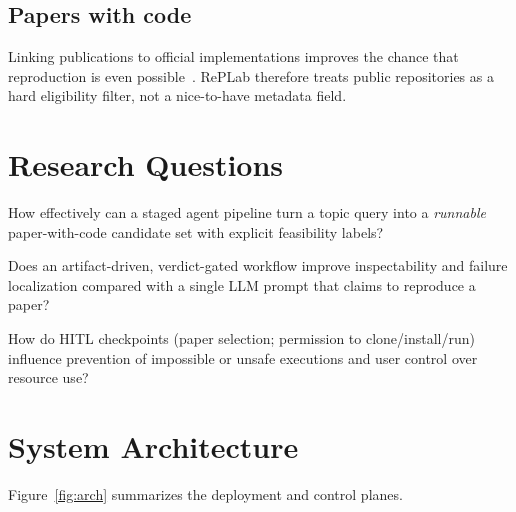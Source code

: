 \documentclass[11pt,a4paper]{article}
\begin{document}
\subsection{Papers with code}
Linking publications to official implementations improves the chance that
reproduction is even possible~\cite{paperswithcode}. RePLab therefore treats
public repositories as a hard eligibility filter, not a nice-to-have metadata
field.

\section{Research Questions}
\label{sec:rqs}

\begin{description}[style=nextline,leftmargin=1.35cm,itemsep=4pt]
  \item[RQ1 (Operationalization)]
    How effectively can a staged agent pipeline turn a topic query into a
    \emph{runnable} paper-with-code candidate set with explicit feasibility
    labels?
  \item[RQ2 (Transparency)]
    Does an artifact-driven, verdict-gated workflow improve inspectability and
    failure localization compared with a single LLM prompt that claims to
    reproduce a paper?
  \item[RQ3 (Trust and safety)]
    How do HITL checkpoints (paper selection; permission to clone/install/run)
    influence prevention of impossible or unsafe executions and user control
    over resource use?
\end{description}

\section{System Architecture}
\label{sec:arch}

Figure~\ref{fig:arch} summarizes the deployment and control planes.
\end{document}
